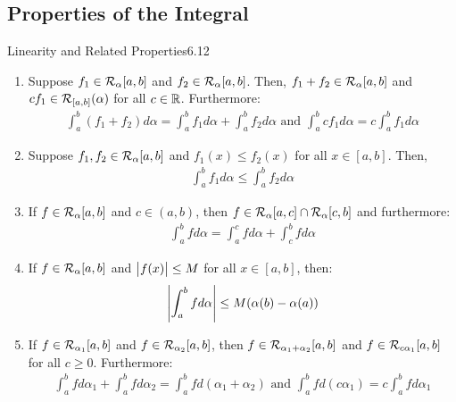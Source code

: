 \subsection{Properties of the Integral}
\begin{theorem}{Linearity and Related Properties}{6.12}
\begin{enumerate}
    \item Suppose $f_1 \in \mathcal{R}_\alpha[a, b]$ and $f_2 \in \mathcal{R}_\alpha[a, b]$. Then, $f_1 + f_2 \in \mathcal{R}_\alpha[a, b]$ and $cf_1 \in \mathcal{R}_{[a,b]}(\alpha)$ for all $c \in \mathbb{R}$. Furthermore:
    \begin{align*}
        \int_a^b(f_1 + f_2) d\alpha = \int_a^b f_1 d\alpha + \int_a^b f_2d\alpha \text{ and } \int_a^b cf_1 d\alpha = c\int_a^b f_1d\alpha
    \end{align*}
    \item Suppose $f_1, f_2 \in \mathcal{R}_\alpha[a, b]$ and $f_1(x) \leq f_2(x)$ for all $x \in [a, b]$. Then,
    \begin{align*}
        \int_a^b f_1 d\alpha \leq \int_a^b f_2d\alpha
    \end{align*}
    \item If $f \in \mathcal{R}_\alpha[a, b]$ and $c \in (a, b)$, then $f \in \mathcal{R}_\alpha[a, c] \cap \mathcal{R}_\alpha[c, b]$ and furthermore:
    \begin{align*}
        \int_a^b f d\alpha = \int_a^c f d\alpha + \int_c^b f d\alpha
    \end{align*}
    \item If $f \in \mathcal{R}_\alpha[a, b]$ and $\abs{f(x)} \leq M$ for all $x \in [a, b]$, then:
    \begin{align*}
        \abs{\int_a^b f d\alpha} \leq M(\alpha(b) - \alpha(a))
    \end{align*}
    \item If $f \in \mathcal{R}_{\alpha_1}[a, b]$ and $f \in \mathcal{R}_{\alpha_2}[a, b]$, then $f \in \mathcal{R}_{\alpha_1 + \alpha_2}[a, b]$ and $f \in \mathcal{R}_{c\alpha_1}[a, b]$ for all $c \geq 0$. Furthermore:
    \begin{align*}
        \int_a^b f d\alpha_1 + \int_a^b f d\alpha_2 = \int_a^b f d(\alpha_1 + \alpha_2) \text{ and } \int_a^b f d(c\alpha_1) = c\int_a^b f d\alpha_1
    \end{align*}

\end{enumerate}
\end{theorem}
